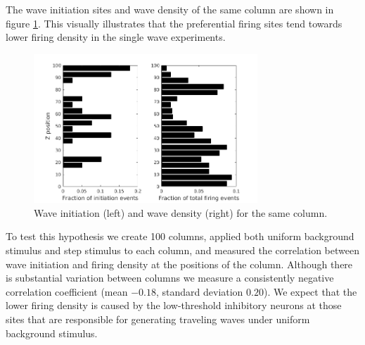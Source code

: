 \documentclass[a4paper,11pt]{article}
\begin{document}
The wave initiation sites and wave density of the same column are shown in figure \ref{fig:initiation_density}.
This visually illustrates that the preferential firing sites tend towards lower firing density in the single wave experiments.
\begin{figure}[!htb]
 \caption{Wave initiation (left) and wave density (right) for the same column.}
 \label{fig:initiation_density}
 \centering
   \includegraphics[width=0.75\textwidth]{fig/InitiationCorrelationHistogram}
\end{figure}

To test this hypothesis we create 100 columns, applied both uniform background stimulus and step stimulus to each column, and measured the correlation between wave initiation and firing density at the positions of the column.
Although there is substantial variation between columns we measure a consistently negative correlation coefficient (mean $-0.18$, standard deviation $0.20$).
We expect that the lower firing density is caused by the low-threshold inhibitory neurons at those sites that are responsible for generating traveling waves under uniform background stimulus.
\end{document}
